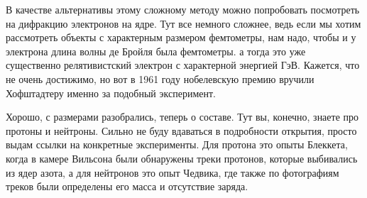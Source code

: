 \documentclass[12pt]{article}
\begin{document}
В качестве альтернативы этому сложному методу можно попробовать посмотреть на дифракцию электронов на ядре. Тут все немного сложнее, ведь если мы хотим рассмотреть объекты с характерным размером фемтометры, нам надо, чтобы и у электрона длина волны де Бройля была фемтометры. а тогда это уже существенно релятивистский электрон с характерной энергией ГэВ. Кажется, что не очень достижимо, но вот в 1961 году нобелевскую премию вручили Хофштадтеру именно за подобный эксперимент.

Хорошо, с размерами разобрались, теперь о составе. Тут вы, конечно, знаете про протоны и нейтроны. Сильно не буду вдаваться в подробности открытия, просто выдам ссылки на конкретные эксперименты. Для протона это опыты Блеккета, когда в камере Вильсона были обнаружены треки протонов, которые выбивались из ядер азота, а для нейтронов это опыт Чедвика, где также по фотографиям треков были определены его масса и отсутствие заряда.
\end{document}
